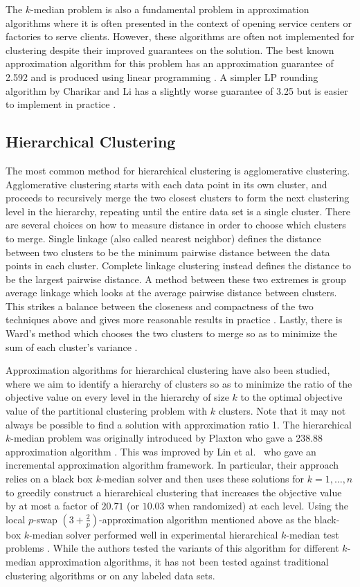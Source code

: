 \documentclass[conference, 10pt, final]{IEEEtran}
\begin{document}
The $k$-median problem is also a fundamental problem in approximation algorithms where it is often presented in the context of opening service centers or factories to serve clients. However, these algorithms are often not implemented for clustering despite their improved guarantees on the solution. The best known approximation algorithm for this problem has an approximation guarantee of 2.592 and is produced using linear programming \cite{Wu}. A simpler LP rounding algorithm by Charikar and Li has a slightly worse guarantee of 3.25 but is easier to implement in practice \cite{Charikar}. 

\subsection{Hierarchical Clustering}
The most common method for hierarchical clustering is agglomerative clustering. Agglomerative clustering starts with each data point in its own cluster, and proceeds to recursively merge the two closest clusters to form the next clustering level in the hierarchy, repeating until the entire data set is a single cluster.  There are several choices on how to measure distance in order to choose which clusters to merge. Single linkage (also called nearest neighbor) defines the distance between two clusters to be the minimum pairwise distance between the data points in each cluster.  Complete linkage clustering instead defines the distance to be the largest pairwise distance. A method between these two extremes is group average linkage which looks at the average pairwise distance between clusters. This strikes a balance between the closeness and compactness of the two techniques above and gives more reasonable results in practice \cite{ESL}. Lastly, there is Ward's method which chooses the two clusters to merge so as to minimize the sum of each cluster's variance \cite{Ward}.

Approximation algorithms for hierarchical clustering have also been studied, where we aim to identify a hierarchy of clusters so as to minimize the ratio of the objective value on every level in the hierarchy of size $k$ to the optimal objective value of the partitional clustering problem with $k$ clusters. Note that it may not always be possible to find a solution with approximation ratio 1. The hierarchical $k$-median problem was originally introduced by Plaxton who gave a 238.88 approximation algorithm \cite{Plaxton}. This was improved by Lin et al.~\cite{Lin} who gave an incremental approximation algorithm framework. In particular, their approach relies on a black box $k$-median solver and then uses these solutions for $k=1, \ldots, n$ to greedily construct a hierarchical clustering that increases the objective value by at most a factor of $20.71$ (or $10.03$ when randomized) at each level. Using the local $p$-swap $(3+\frac{2}{p})$-approximation algorithm mentioned above as the black-box $k$-median solver performed well in experimental hierarchical $k$-median test problems \cite{Nagarajan}. While the authors tested the variants of this algorithm for different $k$-median approximation algorithms, it has not been tested against traditional clustering algorithms or on any labeled data sets. 
\end{document}

